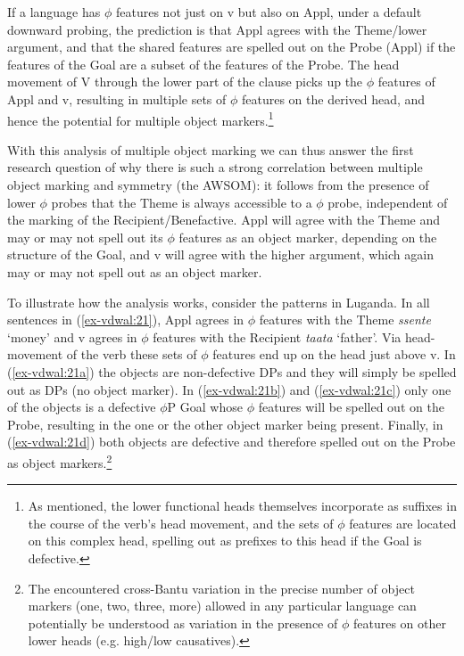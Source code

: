 \documentclass[output=paper
,modfonts
,nonflat]{langsci/langscibook}
\begin{document}
If a language has $\phi$ features not just on v but also on Appl, under a default downward probing, the prediction is that Appl agrees with the Theme/lower argument, and that the shared features are spelled out on the Probe (Appl) if the features of the Goal are a subset of the features of the Probe. The head movement of V through the lower part of the clause picks up the $\phi$ features of Appl and v, resulting in multiple sets of $\phi$ features on the derived head, and hence the potential for multiple object markers.\footnote{As mentioned, the lower functional heads themselves incorporate as suffixes in the course of the verb’s head movement, and the sets of $\phi$ features are located on this complex head, spelling out as prefixes to this head if the Goal is defective.}\largerpage[2]

With this analysis of multiple object marking we can thus answer the first research question of why there is such a strong correlation between multiple object marking and symmetry (the AWSOM): it follows from the presence of lower $\phi$ probes that the Theme is always accessible to a $\phi$ probe, independent of the marking of the Recipient/Benefactive. Appl will agree with the Theme and may or may not spell out its $\phi$ features as an object marker, depending on the structure of the Goal, and v will agree with the higher argument, which again may or may not spell out as an object marker. 

To illustrate how the analysis works, consider the patterns in Luganda. In all sentences in (\ref{ex-vdwal:21}), Appl agrees in $\phi $ features with the Theme \textit{ssente} ‘money’ and v agrees in $\phi$ features with the Recipient \textit{taata} ‘father’. Via head-movement of the verb these sets of $\phi$ features end up on the head just above v. In (\ref{ex-vdwal:21a}) the objects are non-defective DPs and they will simply be spelled out as DPs (no object marker). In (\ref{ex-vdwal:21b}) and (\ref{ex-vdwal:21c}) only one of the objects is a defective $\phi$P Goal whose $\phi$ features will be spelled out on the Probe, resulting in the one or the other object marker being present. Finally, in (\ref{ex-vdwal:21d}) both objects are defective and therefore spelled out on the Probe as object markers.\footnote{The encountered cross-Bantu variation in the precise number of object markers (one, two, three, more) allowed in any particular language \citep{Polak1986, Marlo2015} can potentially be understood as variation in the presence of $\phi$ features on other lower heads (e.g. high/low causatives).}
\end{document}
